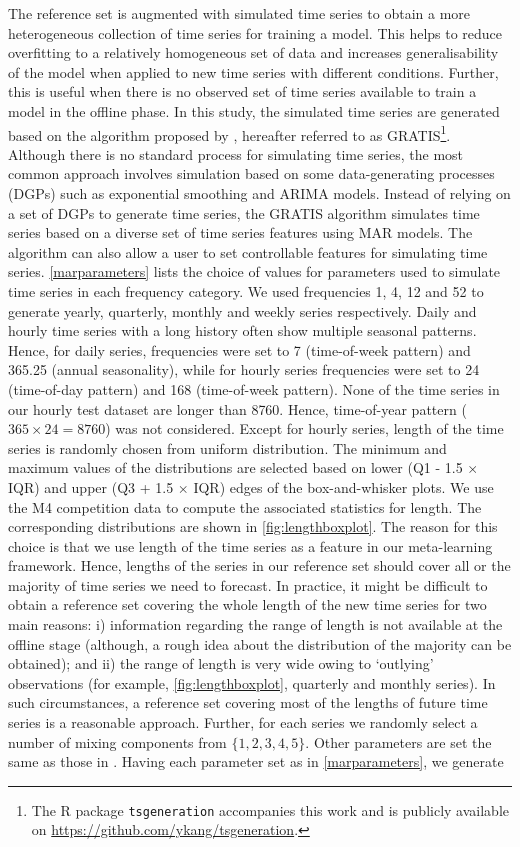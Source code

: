 \documentclass[11pt,a4paper,]{article}
\begin{document}
The reference set is augmented with simulated time series to obtain a more heterogeneous collection of time series for training a model. This helps to reduce overfitting to a relatively homogeneous set of data and increases generalisability of the model when applied to new time series with different conditions. Further, this is useful when there is no observed set of time series available to train a model in the offline phase. In this study, the simulated time series are generated based on the algorithm proposed by \textcite{kang2019gratis}, hereafter referred to as GRATIS\footnote{The R package \texttt{tsgeneration} accompanies this work and is publicly available on \url{https://github.com/ykang/tsgeneration}.}. Although there is no standard process for simulating time series, the most common approach involves simulation based on some data-generating processes (DGPs) such as exponential smoothing and ARIMA models. Instead of relying on a set of DGPs to generate time series, the GRATIS algorithm simulates time series based on a diverse set of time series features using MAR models. The algorithm can also allow a user to set controllable features for simulating time series. \autoref{marparameters} lists the choice of values for parameters used to simulate time series in each frequency category. We used frequencies 1, 4, 12 and 52 to generate yearly, quarterly, monthly and weekly series respectively. Daily and hourly time series with a long history often show multiple seasonal patterns. Hence, for daily series, frequencies were set to 7 (time-of-week pattern) and 365.25 (annual seasonality), while for hourly series frequencies were set to 24 (time-of-day pattern) and 168 (time-of-week pattern). None of the time series in our hourly test dataset are longer than 8760. Hence, time-of-year pattern (\(365\times24=8760\)) was not considered. Except for hourly series, length of the time series is randomly chosen from uniform distribution. The minimum and maximum values of the distributions are selected based on lower (Q1 - 1.5 \(\times\) IQR) and upper (Q3 + 1.5 \(\times\) IQR) edges of the box-and-whisker plots. We use the M4 competition data to compute the associated statistics for length. The corresponding distributions are shown in \autoref{fig:lengthboxplot}. The reason for this choice is that we use length of the time series as a feature in our meta-learning framework. Hence, lengths of the series in our reference set should cover all or the majority of time series we need to forecast. In practice, it might be difficult to obtain a reference set covering the whole length of the new time series for two main reasons: i) information regarding the range of length is not available at the offline stage (although, a rough idea about the distribution of the majority can be obtained); and ii) the range of length is very wide owing to `outlying' observations (for example, \autoref{fig:lengthboxplot}, quarterly and monthly series). In such circumstances, a reference set covering most of the lengths of future time series is a reasonable approach. Further, for each series we randomly select a number of mixing components from \(\{1, 2, 3, 4, 5\}\). Other parameters are set the same as those in \textcite{kang2019gratis}. Having each parameter set as in \autoref{marparameters}, we generate 
\end{document}

